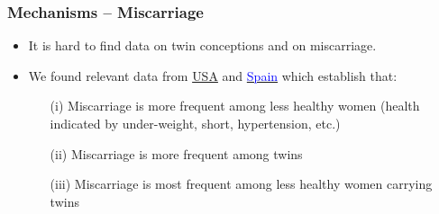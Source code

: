 \documentclass[9pt,letterpaper,subeqn]{beamer}
\begin{document}



\begin{frame}[label=mech]
\frametitle{Mechanisms -- Miscarriage}
\begin{itemize}
\item It is hard to find data on twin conceptions and on miscarriage. 
\item We found relevant data from \hyperlink{TwinDeathUSA}{USA} and \hyperlink{TwinDeathSpain}{\textcolor{blue}{Spain}} which establish that:
\begin{enumerate}
\item[(i)] Miscarriage is more frequent among less healthy women (health indicated by under-weight, short, hypertension, etc.)
\item[(ii)] Miscarriage is more frequent among twins
\item[(iii)] Miscarriage is most frequent among less healthy women carrying twins
\end{enumerate}
\end{itemize}
\end{frame}
\end{document}
